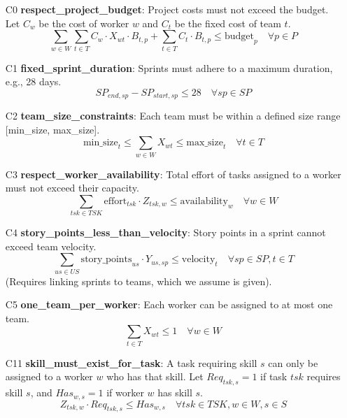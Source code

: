 \documentclass[11pt]{article}
\begin{document}
\begin{itemize}
    \item [C0] \textbf{respect\_project\_budget}: Project costs must not exceed the budget. Let $C_w$ be the cost of worker $w$ and $C_t$ be the fixed cost of team $t$.
    $$ \sum_{w \in W} \sum_{t \in T} C_w \cdot X_{wt} \cdot B_{t,p} + \sum_{t \in T} C_t \cdot B_{t,p} \le \text{budget}_p \quad \forall p \in P $$

    \item [C1] \textbf{fixed\_sprint\_duration}: Sprints must adhere to a maximum duration, e.g., 28 days.
    $$ SP_{end,sp} - SP_{start,sp} \le 28 \quad \forall sp \in SP $$

    \item [C2] \textbf{team\_size\_constraints}: Each team must be within a defined size range [min\_size, max\_size].
    $$ \text{min\_size}_t \le \sum_{w \in W} X_{wt} \le \text{max\_size}_t \quad \forall t \in T $$

    \item [C3] \textbf{respect\_worker\_availability}: Total effort of tasks assigned to a worker must not exceed their capacity.
    $$ \sum_{tsk \in TSK} \text{effort}_{tsk} \cdot Z_{tsk,w} \le \text{availability}_w \quad \forall w \in W $$

    \item [C4] \textbf{story\_points\_less\_than\_velocity}: Story points in a sprint cannot exceed team velocity.
    $$ \sum_{us \in US} \text{story\_points}_{us} \cdot Y_{us,sp} \le \text{velocity}_t \quad \forall sp \in SP, t \in T $$
    (Requires linking sprints to teams, which we assume is given).

    \item [C5] \textbf{one\_team\_per\_worker}: Each worker can be assigned to at most one team.
    $$ \sum_{t \in T} X_{wt} \le 1 \quad \forall w \in W $$
    
    \item [C11] \textbf{skill\_must\_exist\_for\_task}: A task requiring skill $s$ can only be assigned to a worker $w$ who has that skill. Let $Req_{tsk,s}=1$ if task $tsk$ requires skill $s$, and $Has_{w,s}=1$ if worker $w$ has skill $s$.
    $$ Z_{tsk,w} \cdot Req_{tsk,s} \le Has_{w,s} \quad \forall tsk \in TSK, w \in W, s \in S $$

\end{itemize}
\end{document}
